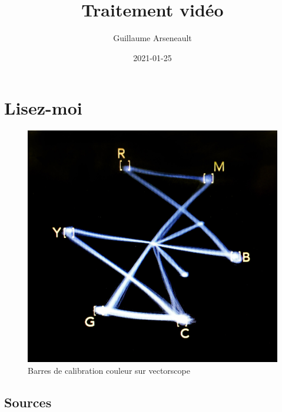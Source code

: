 \documentclass[
]{book}
\title{Traitement vidéo}
\author{Guillaume Arseneault}
\date{2021-01-25}
\begin{document}
\maketitle

{
\setcounter{tocdepth}{1}
\tableofcontents
}
\hypertarget{lisez-moi}{%
\chapter{Lisez-moi}\label{lisez-moi}}

\begin{figure}
\centering
\includegraphics{images/vectorscope.jpg}
\caption{\label{fig:unnamed-chunk-1}Barres de calibration couleur sur vectorscope \citep{marsh_ColorBarsVectorscope_2016}}
\end{figure}

\hypertarget{sources}{%
\section{Sources}\label{sources}}
\end{document}
